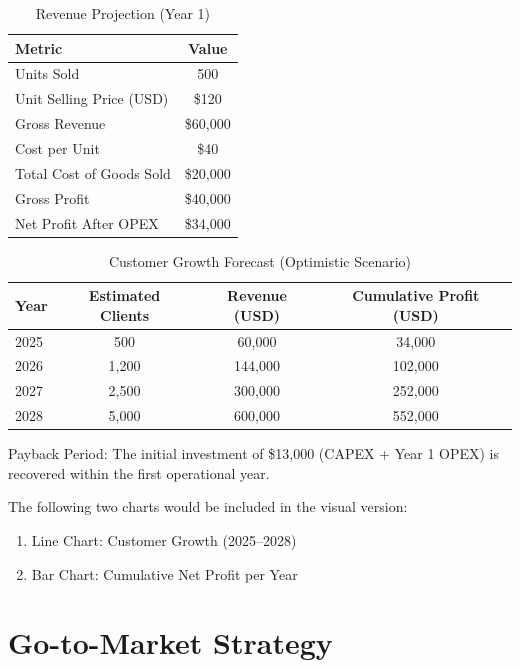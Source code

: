 \documentclass{IEEEtran}
\begin{document}
\begin{table}
    \centering
    \caption{Revenue Projection (Year 1)}
    \label{tab: Revenue Projection (Year 1)}
    \begin{tabular}{|l|c|}
        \hline
        \textbf{Metric} & \textbf{Value} \\
        \hline
        Units Sold & 500 \\
        Unit Selling Price (USD) & \$120 \\
        Gross Revenue & \$60,000 \\
        Cost per Unit & \$40 \\
        Total Cost of Goods Sold & \$20,000 \\
        Gross Profit & \$40,000 \\
        Net Profit After OPEX & \$34,000 \\
        \hline
    \end{tabular}
\end{table}

\begin{table}
    \centering
    \caption{Customer Growth Forecast (Optimistic Scenario)}
    \label{tab: Customer Growth Forecast (Optimistic Scenario)}
    \begin{tabular}{|l|c|c|c|}
        \hline
        \textbf{Year} & \textbf{Estimated Clients} & \textbf{Revenue (USD)} & \textbf{Cumulative Profit (USD)} \\
        \hline
        2025 & 500 & 60,000 & 34,000 \\
        2026 & 1,200 & 144,000 & 102,000 \\
        2027 & 2,500 & 300,000 & 252,000 \\
        2028 & 5,000 & 600,000 & 552,000 \\
        \hline
    \end{tabular}
\end{table}

Payback Period: The initial investment of \$13,000 (CAPEX + Year 1 OPEX) is recovered within the first operational year.

The following two charts would be included in the visual version:
\begin{enumerate}
    \item Line Chart: Customer Growth (2025–2028)
    \item Bar Chart: Cumulative Net Profit per Year
\end{enumerate}

\section{Go-to-Market Strategy}
\end{document}
